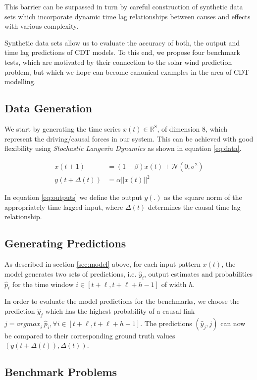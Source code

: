 \documentclass[twoside]{article}
\begin{document}
This barrier can be surpassed in turn by careful construction of synthetic data sets which incorporate dynamic time lag relationships between causes and effects with various complexity.

Synthetic data sets allow us to evaluate the accuracy of both, the output and time lag predictions of CDT models. To this end, we propose four benchmark tests, which are motivated by their connection to the solar wind prediction problem, but which we hope can become canonical examples in the area of CDT modelling.

\subsection{Data Generation}

We start by generating the time series $x(t) \in \mathbb{R}^8$, of dimension $8$, which represent the driving/causal forces in our system. This can be achieved with good flexibility using \emph{Stochastic Langevin Dynamics} as shown in equation \ref{eq:data}. 

\begin{align}
 x(t+1) &= (1 - \beta) x(t) + \mathcal{N}(0, \sigma^2) \label{eq:data}\\
 y(t+\Delta(t)) &= \alpha ||x(t)||^2 \label{eq:outputs}
\end{align}

In equation \ref{eq:outputs} we define the output $y(.)$ as the square norm of the appropriately time lagged input, where $\Delta(t)$ determines the causal time lag relationship.

\subsection{Generating Predictions}

As described in section \ref{sec:model} above, for each input pattern $x(t)$, the model generates two sets of predictions, i.e. ${\hat{y}_i}$, output estimates and probabilities $\hat{p}_i$ for the time window $i \in [t+\ell, t+\ell+h-1]$ of width $h$. 

In order to evaluate the model predictions for the benchmarks, we choose the prediction $\hat{y}_j$ which has the highest probability of a causal link $j = {argmax}_{i} \ \hat{p}_i, \forall i \in [t+\ell, t+\ell+h-1]$. The predictions $(\hat{y}_j, j)$ can now be compared to their corresponding ground truth values $(y(t + \Delta(t)), \Delta(t))$.


\subsection{Benchmark Problems}\label{sec:benchmark}
\end{document}
